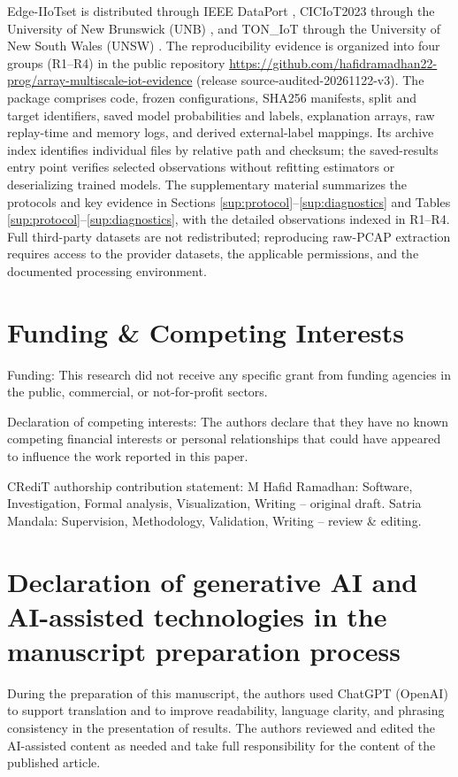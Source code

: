 \documentclass[final,3p,10pt,nopreprintline]{elsarticle}
\begin{document}
Edge-IIoTset is distributed through IEEE DataPort \cite{r1}, CICIoT2023 through the University of New Brunswick (UNB) \cite{r27}, and TON\_IoT through the University of New South Wales (UNSW) \cite{r28,r30}. The reproducibility evidence is organized into four groups (R1--R4) in the public repository \url{https://github.com/hafidramadhan22-prog/array-multiscale-iot-evidence} (release source-audited-20261122-v3). The package comprises code, frozen configurations, SHA256 manifests, split and target identifiers, saved model probabilities and labels, explanation arrays, raw replay-time and memory logs, and derived external-label mappings. Its archive index identifies individual files by relative path and checksum; the saved-results entry point verifies selected observations without refitting estimators or deserializing trained models. The supplementary material summarizes the protocols and key evidence in Sections \ref*{sup:protocol}--\ref*{sup:diagnostics} and Tables \ref*{sup:protocol}--\ref*{sup:diagnostics}, with the detailed observations indexed in R1--R4. Full third-party datasets are not redistributed; reproducing raw-PCAP extraction requires access to the provider datasets, the applicable permissions, and the documented processing environment.

\section*{Funding \& Competing Interests}

Funding: This research did not receive any specific grant from funding agencies in the public, commercial, or not-for-profit sectors.

Declaration of competing interests: The authors declare that they have no known competing financial interests or personal relationships that could have appeared to influence the work reported in this paper.

CRediT authorship contribution statement: M Hafid Ramadhan: Software, Investigation, Formal analysis, Visualization, Writing -- original draft. Satria Mandala: Supervision, Methodology, Validation, Writing -- review \& editing.

\section*{Declaration of generative AI and AI-assisted technologies in the manuscript preparation process}

During the preparation of this manuscript, the authors used ChatGPT (OpenAI) to support translation and to improve readability, language clarity, and phrasing consistency in the presentation of results. The authors reviewed and edited the AI-assisted content as needed and take full responsibility for the content of the published article.




\end{document}
